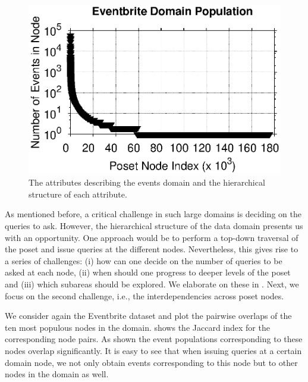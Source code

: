 \begin{figure}
	\begin{center}
	\includegraphics[clip,scale=0.5]{figs/eventbritepop.eps}
	\vspace{-15pt}
	\caption{The attributes describing the events domain and the hierarchical structure of each attribute.}
	\label{fig:eventbritepop}
	\vspace{-20pt}
	\end{center}
\end{figure}

As mentioned before, a critical challenge in such large domains is deciding on the queries to ask. However, the hierarchical structure of the data domain presents us with an opportunity. One approach would be to perform a top-down traversal of the poset and issue queries at the different nodes. Nevertheless, this gives rise to a series of challenges: (i) how can one decide on the number of queries to be asked at each node, (ii) when should one progress to deeper levels of the poset and (iii) which subareas should be explored. We elaborate on these in . Next, we focus on the second challenge, i.e., the interdependencies across poset nodes. 

\begin{example}
We consider again the Eventbrite dataset and plot the pairwise overlaps of the ten most populous nodes in the domain.  shows the Jaccard index for the corresponding node pairs. As shown the event populations corresponding to these nodes overlap significantly. It is easy to see that when issuing queries at a certain domain node, we not only obtain events corresponding to this node but to other nodes in the domain as well. 
\end{example}

